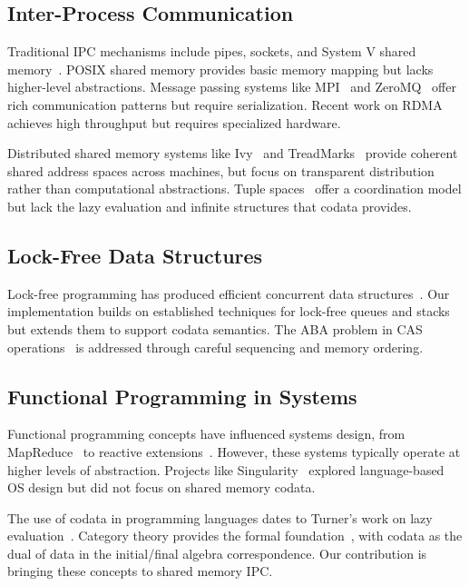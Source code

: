 \documentclass[10pt,conference]{IEEEtran}
\begin{document}
\subsection{Inter-Process Communication}

Traditional IPC mechanisms include pipes, sockets, and System V shared memory~\cite{stevens2013advanced}. POSIX shared memory provides basic memory mapping but lacks higher-level abstractions. Message passing systems like MPI~\cite{gropp1996high} and ZeroMQ~\cite{hintjens2013zeromq} offer rich communication patterns but require serialization. Recent work on RDMA~\cite{kalia2014using} achieves high throughput but requires specialized hardware.

Distributed shared memory systems like Ivy~\cite{li1988shared} and TreadMarks~\cite{amza1996treadmarks} provide coherent shared address spaces across machines, but focus on transparent distribution rather than computational abstractions. Tuple spaces~\cite{gelernter1985generative} offer a coordination model but lack the lazy evaluation and infinite structures that codata provides.

\subsection{Lock-Free Data Structures}

Lock-free programming has produced efficient concurrent data structures~\cite{michael1996simple, harris2001pragmatic}. Our implementation builds on established techniques for lock-free queues and stacks but extends them to support codata semantics. The ABA problem in CAS operations~\cite{dechev2010understanding} is addressed through careful sequencing and memory ordering.

\subsection{Functional Programming in Systems}

Functional programming concepts have influenced systems design, from MapReduce~\cite{dean2008mapreduce} to reactive extensions~\cite{meijer2012your}. However, these systems typically operate at higher levels of abstraction. Projects like Singularity~\cite{hunt2007singularity} explored language-based OS design but did not focus on shared memory codata.

The use of codata in programming languages dates to Turner's work on lazy evaluation~\cite{turner1979new}. Category theory provides the formal foundation~\cite{hagino1987category}, with codata as the dual of data in the initial/final algebra correspondence. Our contribution is bringing these concepts to shared memory IPC.
\end{document}
